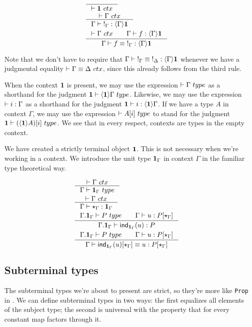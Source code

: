 \begin{align}
& \inference{}{\jctx{\unit}}\\
& \inference{\jctx{\Gamma}}{\jhom{\Gamma}{\unit}{\tounit{\Gamma}}}\\
& \inference{\jctx{\Gamma}\qquad\jhom{\Gamma}{\unit}{f}}{\jhomeq{\Gamma}{\unit}{f}{\tounit{\Gamma}}}
\end{align}

Note that we don't have to require that $\jhomeq{\Gamma}{\unit}{\tounit{\Gamma}}{\tounit{\Delta}}$
whenever we have a judgmental equality $\jctxeq{\Gamma}{\Delta}$, since this already follows from the third rule.

When the context $\mathbf{1}$ is present, we may use the expression $\jtype{}{\Gamma}$
as a shorthand for the judgment $\jtype{\unit}{\ctxwk{\unit}{\Gamma}}$. Likewise,
we may use the expression $\jtermc{\Gamma}{i}$ as a shorthand
for the judgment $\jhom{\unit}{\Gamma}{i}$. If we have a type $A$ in context
$\Gamma$, we may use the expression $\jtype{}{\subst{i}{A}}$ to stand for
the judgment $\jtype{\unit}{\subst{i}{\ctxwk{\unit}{A}}}$. We see that in every
respect, contexts are types in the empty context.

We have created a strictly terminal object $\mathbf{1}$. This is not necessary when
we're working in a context. We introduce the unit type $\mathbf{1}_\Gamma$ in context
$\Gamma$ in the familiar type theoretical way.

\begin{align}
& \inference{\jctx{\Gamma}}{\jtype{\Gamma}{\unit_\Gamma}}\\
& \inference{\jctx{\Gamma}}{\jterm{\Gamma}{\unit_\Gamma}{\ttt_\Gamma}}\\
& \inference{\jtype{\ctxext{\Gamma}{\unit_\Gamma}}{P}\qquad\jterm{\Gamma}{\subst{\ttt_\Gamma}{P}}{u}}
          {\jterm{\ctxext{\Gamma}{\unit_\Gamma}}{P}{\ind{\unit_\Gamma}(u)}}\\
& \inference{\jtype{\ctxext{\Gamma}{\unit_\Gamma}}{P}\qquad\jterm{\Gamma}{\subst{\ttt_\Gamma}{P}}{u}}
          {\jtermeq{\Gamma}{\subst{\ttt_\Gamma}{P}}{\subst{\ttt_\Gamma}{\ind{\unit_\Gamma}(u)}}{u}}
\end{align}

\subsection{Subterminal types}
The subterminal types we're about to present are strict, so they're more like \verb+Prop+
in \Coq. We can define subterminal types in two ways: the first equalizes all elements
of the subject type; the second is universal with the property that for every constant
map factors through it.

